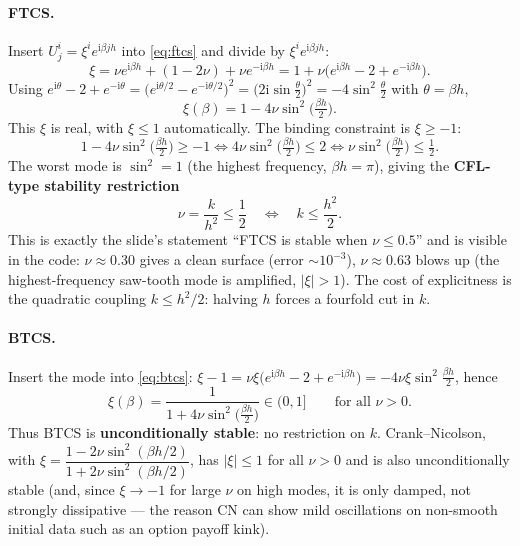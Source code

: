 \documentclass[11pt]{article}
\begin{document}
\paragraph{FTCS.} Insert $U^i_j=\xi^i e^{\mathrm i\beta jh}$ into \eqref{eq:ftcs} and divide by $\xi^i e^{\mathrm i\beta jh}$:
\[
\xi = \nu e^{\mathrm i\beta h} + (1-2\nu) + \nu e^{-\mathrm i\beta h}
= 1 + \nu\big(e^{\mathrm i\beta h}-2+e^{-\mathrm i\beta h}\big).
\]
Using $e^{\mathrm i\theta}-2+e^{-\mathrm i\theta} = \big(e^{\mathrm i\theta/2}-e^{-\mathrm i\theta/2}\big)^2 = \big(2\mathrm i\sin\tfrac\theta2\big)^2 = -4\sin^2\tfrac\theta2$ with $\theta=\beta h$,
\begin{equation}
\xi(\beta) = 1 - 4\nu\sin^2\!\Big(\tfrac{\beta h}{2}\Big).
\label{eq:ftcsxi}
\end{equation}
This $\xi$ is real, with $\xi\le 1$ automatically. The binding constraint is $\xi\ge -1$:
\[
1-4\nu\sin^2\!\Big(\tfrac{\beta h}{2}\Big)\ge -1
\iff 4\nu\sin^2\!\Big(\tfrac{\beta h}{2}\Big)\le 2
\iff \nu\sin^2\!\Big(\tfrac{\beta h}{2}\Big)\le \tfrac12 .
\]
The worst mode is $\sin^2=1$ (the highest frequency, $\beta h=\pi$), giving the \textbf{CFL-type stability restriction}
\begin{equation}
\boxed{\ \nu = \frac{k}{h^2}\le \frac12 \quad\Longleftrightarrow\quad k\le \frac{h^2}{2}.\ }
\label{eq:cfl}
\end{equation}
This is exactly the slide's statement ``FTCS is stable when $\nu\le0.5$'' and is visible in the code: $\nu\approx0.30$ gives a clean surface (error $\sim10^{-3}$), $\nu\approx0.63$ blows up (the highest-frequency saw-tooth mode is amplified, $|\xi|>1$). The cost of explicitness is the quadratic coupling $k\le h^2/2$: halving $h$ forces a fourfold cut in $k$.

\paragraph{BTCS.} Insert the mode into \eqref{eq:btcs}: $\xi-1 = \nu\xi\big(e^{\mathrm i\beta h}-2+e^{-\mathrm i\beta h}\big)=-4\nu\xi\sin^2\tfrac{\beta h}{2}$, hence
\begin{equation}
\xi(\beta) = \frac{1}{1+4\nu\sin^2\!\big(\tfrac{\beta h}{2}\big)} \in (0,1]\qquad\text{for all }\nu>0.
\label{eq:btcsxi}
\end{equation}
Thus BTCS is \textbf{unconditionally stable}: no restriction on $k$. Crank--Nicolson, with $\xi=\dfrac{1-2\nu\sin^2(\beta h/2)}{1+2\nu\sin^2(\beta h/2)}$, has $|\xi|\le1$ for all $\nu>0$ and is also unconditionally stable (and, since $\xi\to-1$ for large $\nu$ on high modes, it is only damped, not strongly dissipative --- the reason CN can show mild oscillations on non-smooth initial data such as an option payoff kink).
\end{document}
